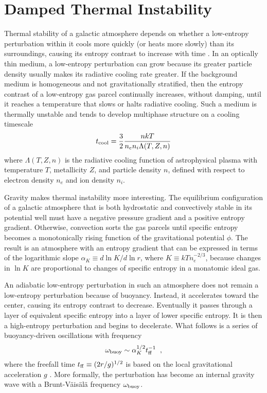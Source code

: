 \documentclass[twocolumn]{aastex63}
\begin{document}
\section{Damped Thermal Instability}
\label{sec:damping}

Thermal stability of a galactic atmosphere depends on whether a low-entropy perturbation within it cools more quickly (or heats more slowly) than its surroundings, causing its entropy contrast to increase with time \citep[e.g.,][]{Field65,Balbus86,Balbus88}.  In an optically thin medium, a low-entropy perturbation can grow because its greater particle density usually makes its radiative cooling rate greater.  If the background medium is homogeneous and not gravitationally stratified, then the entropy contrast of a low-entropy gas parcel continually increases, without damping, until it reaches a temperature that slows or halts radiative cooling.  Such a medium is thermally unstable and tends to develop multiphase structure on a cooling timescale
\begin{equation}
    t_{\rm cool} = \frac {3}{2} \frac {nkT} {n_e n_i \Lambda(T,Z,n)}
\end{equation}
where $\Lambda(T,Z,n)$ is the radiative cooling function of astrophysical plasma with temperature $T$, metallicity $Z$, and particle density $n$, defined with respect to electron density $n_e$ and ion density $n_i$.  

Gravity makes thermal instability more interesting.  The equilibrium configuration of a galactic atmosphere that is both hydrostatic and convectively stable in its potential well must have a negative pressure gradient and a positive entropy gradient.  Otherwise, convection sorts the gas parcels until specific entropy becomes a monotonically rising function of the gravitational potential $\phi$.  The result is an atmosphere with an entropy gradient that can be expressed in terms of the logarithmic slope $\alpha_K \equiv d \ln K / d \ln r$, where $K \equiv kTn_e^{-2/3}$, because changes in $\ln K$ are proportional to changes of specific entropy in a monatomic ideal gas.  

An adiabatic low-entropy perturbation in such an atmosphere does not remain a low-entropy perturbation because of buoyancy. Instead, it accelerates toward the center, causing its entropy contrast to decrease. Eventually it passes through a layer of equivalent specific entropy into a layer of lower specific entropy. It is then a high-entropy perturbation and begins to decelerate.  What follows is a series of buoyancy-driven oscillations with frequency
\begin{equation}
    \omega_{\rm buoy} \sim \alpha_K^{1/2} t_{\rm ff}^{-1}
    \; \; ,
\end{equation}
where the freefall time $t_{\rm ff} \equiv (2r/g)^{1/2}$ is based on the local gravitational acceleration $g$ \citep[e.g.,][]{Voit_2017_BigPaper}.  More formally, the perturbation has become an internal gravity wave with a Brunt-V\"ais\"al\"a frequency $\omega_{\rm buoy}$.
\end{document}
